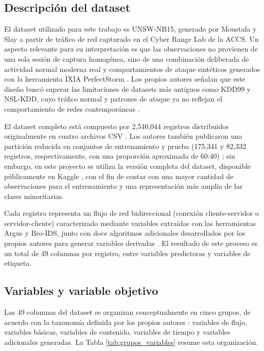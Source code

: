 \documentclass[conference]{IEEEtran}
\begin{document}
\subsection{Descripción del dataset}

\FloatBarrier

El dataset utilizado para este trabajo es UNSW-NB15, generado por 
Moustafa y Slay \cite{moustafa2015unsw} a partir de tráfico de red 
capturado en el Cyber Range Lab de la ACCS. Un aspecto relevante 
para su interpretación es que las observaciones no provienen de una 
sola sesión de captura homogénea, sino de una combinación deliberada 
de actividad normal moderna real y comportamientos de ataque 
sintéticos generados con la herramienta IXIA PerfectStorm 
\cite{moustafa2015unsw}. Los propios autores señalan que este diseño 
buscó superar las limitaciones de datasets más antiguos como KDD99 y 
NSL-KDD, cuyo tráfico normal y patrones de ataque ya no reflejan el 
comportamiento de redes contemporáneas \cite{moustafa2016evaluation}.

El dataset completo está compuesto por 2{,}540{,}044 registros 
distribuidos originalmente en cuatro archivos CSV 
\cite{moustafa2015unsw}. Los autores también publicaron una partición 
reducida en conjuntos de entrenamiento y prueba (175{,}341 y 82{,}332 
registros, respectivamente, con una proporción aproximada de 60:40) 
\cite{moustafa2016evaluation}; sin embargo, en este proyecto se 
utiliza la versión completa del dataset, disponible públicamente en 
Kaggle \cite{kaggle_unsw}, con el fin de contar con una mayor cantidad 
de observaciones para el entrenamiento y una representación más 
amplia de las clases minoritarias. 

Cada registro representa un flujo de red bidireccional (conexión 
cliente-servidor o servidor-cliente) caracterizado mediante variables 
extraídas con las herramientas Argus y Bro-IDS, junto con doce 
algoritmos adicionales desarrollados por los propios autores para 
generar variables derivadas \cite{moustafa2015unsw}. El resultado de 
este proceso es un total de 49 columnas por registro, entre variables 
predictoras y variables de etiqueta.

\FloatBarrier

\subsection{Variables y variable objetivo}

Las 49 columnas del dataset se organizan conceptualmente en cinco 
grupos, de acuerdo con la taxonomía definida por los propios autores 
\cite{moustafa2016evaluation}: variables de flujo, variables básicas, 
variables de contenido, variables de tiempo y variables adicionales 
generadas. La Tabla \ref{tab:grupos_variables} resume esta 
organización.
\end{document}
